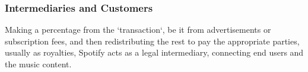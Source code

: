 \subsubsection{Intermediaries and Customers}
Making a percentage from the `transaction`, be it from advertisements or subscription fees, and then redistributing the rest to pay the appropriate parties, usually as royalties, Spotify acts as a legal intermediary, connecting end users and the music content.